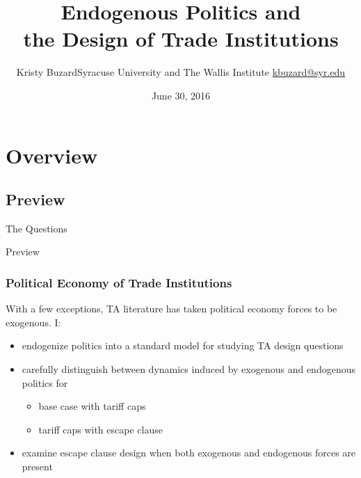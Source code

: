 \documentclass[handout]{beamer}
\title[Endogenous Politics and the Design of Trade Institutions\hspace{2.05in}\insertframenumber/\inserttotalframenumber]{Endogenous Politics and \\ the Design of Trade Institutions}
\author[Kristy Buzard]{\texorpdfstring{Kristy Buzard\newline Syracuse University and The Wallis Institute  \newline\url{kbuzard@syr.edu}}{Kristy Buzard}}
\date{June 30, 2016}
\begin{document}
\maketitle




\section{Overview}
\subsection{Preview}
\begin{frame}{The Questions}

\pause
{}

\end{frame}


\begin{frame}{Preview}
\frametitle{Political Economy of Trade Institutions}
\pause
With a few exceptions, TA literature has taken political economy forces to be exogenous. I:
\pause
\begin{itemize}[<+->]
	\item endogenize politics into a standard model for studying TA design questions
	\item carefully distinguish between dynamics induced by exogenous and endogenous politics for
		\begin{itemize}[<+->]
			\item base case with tariff caps
			\item tariff caps with escape clause
		\end{itemize}
	\item examine escape clause design when both exogenous and endogenous forces are present
\end{itemize}
\end{frame}
\end{document}
